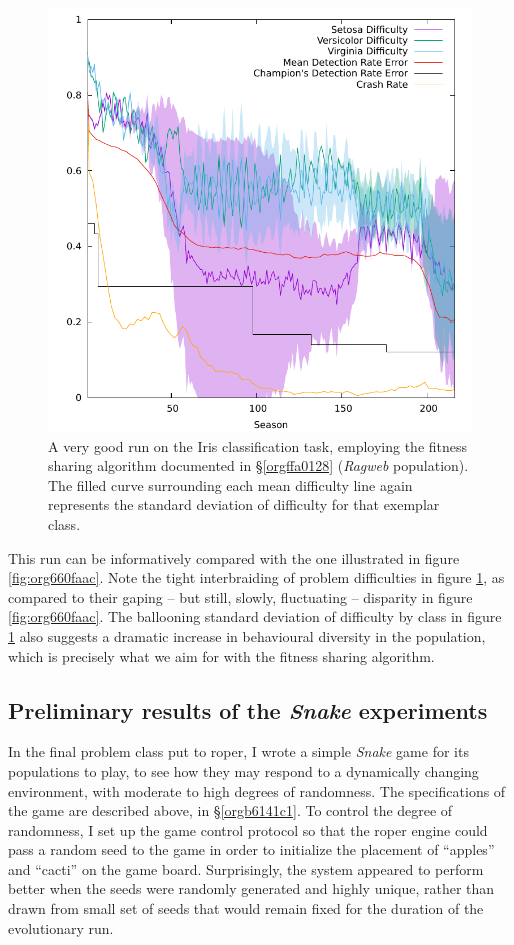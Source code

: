 \documentclass[12pt,glossary]{dalthesis}
\begin{document}
\begin{figure}[htbp]
\centering
\includegraphics[width=.9\linewidth]{../images/plots/sharing.pdf}
\caption{\label{fig:orgcb153ed}
A very good run on the Iris classification task, employing the fitness sharing algorithm documented in \S \ref{orgffa0128} (\emph{Ragweb} population). The filled curve surrounding each mean difficulty line again represents the standard deviation of difficulty for that exemplar class.}
\end{figure}



This run can be informatively compared with the one illustrated in figure
\ref{fig:org660faac}. Note the tight interbraiding of problem difficulties in
figure \ref{fig:orgcb153ed}, as compared to their gaping -- but still, slowly,
fluctuating -- disparity in figure \ref{fig:org660faac}. The ballooning standard
deviation of difficulty by class in figure \ref{fig:orgcb153ed} also suggests
a dramatic increase in behavioural diversity in the population, which is
precisely what we aim for with the fitness sharing algorithm.


\subsection{Preliminary results of the \emph{Snake} experiments}
\label{sec:orgb2c17eb}
\label{org7f22b25}

In the final problem class put to \gls{roper}, I wrote a simple \emph{Snake} game
\cite{snakefight} for its populations to play, to see how they may respond to a
dynamically changing environment, with moderate to high degrees of randomness.
The specifications of the game are described above, in \S \ref{orgb6141c1}.
To control the degree of randomness, I set up the game control protocol so that
the \gls{roper} engine could pass a random seed to the game in order to initialize
the placement of ``apples'' and ``cacti'' on the game board. Surprisingly, the 
system appeared to perform better when the seeds were randomly generated and
highly unique, rather than drawn from small set of seeds that would remain fixed
for the duration of the evolutionary run. 
\end{document}
